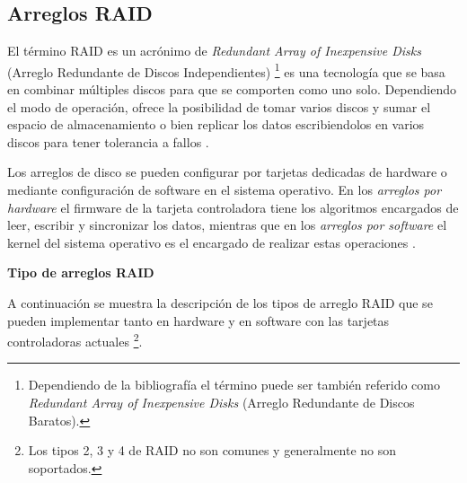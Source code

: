   \subsection {Arreglos RAID}
  \label{Arreglos-RAID}

El t\'{e}rmino \textsc{RAID} es un acr\'{o}nimo de \emph{Redundant Array of Inexpensive Disks} (Arreglo Redundante de Discos Independientes) \footnote{Dependiendo de la bibliograf\'{i}a el t\'{e}rmino puede ser tambi\'{e}n referido como \emph{Redundant Array of Inexpensive Disks} (Arreglo Redundante de Discos Baratos).} \cite{_bytepile.com_????} es una tecnolog\'{i}a que se basa en combinar m\'{u}ltiples discos para que se comporten como uno solo. Dependiendo el modo de operaci\'{o}n, ofrece la posibilidad de tomar varios discos y sumar el espacio de almacenamiento o bien replicar los datos escribiendolos en varios discos para tener tolerancia a fallos \cite{_raid_????-2}.

Los arreglos de disco se pueden configurar por tarjetas dedicadas de hardware o mediante configuraci\'{o}n de software en el sistema operativo. En los \emph{arreglos por hardware} el firmware de la tarjeta controladora tiene los algoritmos encargados de leer, escribir y sincronizar los datos, mientras que en los \emph{arreglos por software} el kernel del sistema operativo es el encargado de realizar estas operaciones \cite{_chapter_????}.

\textbf{Tipo de arreglos RAID}

A continuaci\'{o}n se muestra la descripci\'{o}n de los tipos de arreglo \textsc{RAID} que se pueden implementar tanto en hardware y en software con las tarjetas controladoras actuales \footnote{Los tipos 2, 3 y 4 de \textsc{RAID} no son comunes y generalmente no son soportados.}.


